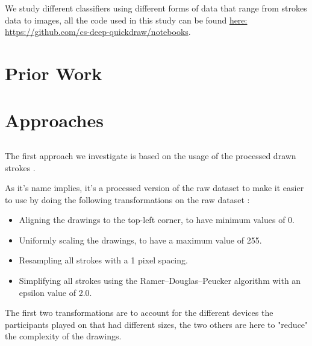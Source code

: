 \documentclass[10pt,twocolumn,letterpaper]{article}
\begin{document}
We study different classifiers using different forms of data that range from strokes data to images, all the code used in this study can be found \href{https://github.com/cs-deep-quickdraw/notebooks}{here: https://github.com/cs-deep-quickdraw/notebooks}.



\section{Prior Work}


\section{Approaches}

\subsection{\rnnTitle{}}

The first approach we investigate is based on the usage of the processed drawn strokes \cite{GoogleQuickdraw}.

As it's name implies, it's a processed version of the raw dataset to make it easier to use by doing the following transformations on the raw dataset \cite{GoogleQuickdraw}:

\begin{itemize}
    \item Aligning the drawings to the top-left corner, to have minimum values of 0.
    \item Uniformly scaling the drawings, to have a maximum value of 255.
    \item Resampling all strokes with a 1 pixel spacing.
    \item Simplifying all strokes using the Ramer–Douglas–Peucker \cite{wiki:rdp_algo} algorithm with an epsilon value of 2.0.
\end{itemize}

The first two transformations are to account for the different devices the participants played on that had different sizes, the two others are here to "reduce" the complexity of the drawings.
\end{document}
